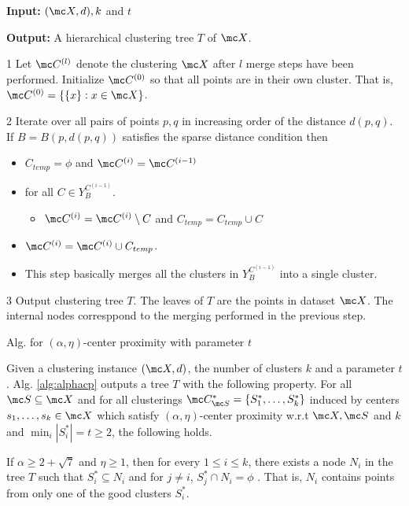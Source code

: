 \documentclass[11pt]{article}
\begin{document}
\begin{algorithm}[!ht]
\begin{alg}
	\item \textbf{Input: } $(\mc X, d), k$ and $t$
	\item \textbf{Output: } A hierarchical clustering tree $T$ of $\mc X$.
	\item[1] Let $\mc C^{(l)}$ denote the clustering $\mc X$ after $l$ merge steps have been performed. Initialize $\mc C^{(0)}$ so that all points are in their own cluster. That is, $\mc C^{(0)} = \{ \{x\}: x \in \mc X\}$.
	\item[2] Iterate over all pairs of points $p, q$ in increasing order of the distance $d(p, q)$. If $B = B(p, d(p, q))$ satisfies the sparse distance condition then
	\begin{itemize}
	\renewcommand\labelitemi{}
		\item $C_{temp} = \phi$ and $\mc C^{(i)} = \mc C^{(i-1)}$
		\item for all $C \in Y_B^{C^{(i-1)}}$.
		\begin{itemize}
		\renewcommand\labelitemii{}
			\item $\mc C^{(i)} = \mc C^{(i)} \setminus C$ and $C_{temp} = C_{temp} \cup C$
		\end{itemize}
		\item $\mc C^{(i)} = \mc C^{(i)} \cup C_{temp}$.
		\item This step basically merges all the clusters in $Y_B^{C^{(i-1)}}$ into a single cluster.
	\end{itemize}
	\item[3] Output clustering tree $T$. The leaves of $T$ are the points in dataset $\mc X$. The internal nodes corresppond to the merging performed in the previous step.
\end{alg}
\caption{Alg. for $(\alpha, \eta)$-center proximity with parameter $t$}
\label{alg:alphacp}
\end{algorithm}


\begin{theorem}
\label{thm:alphacpnoise}
Given a clustering instance $(\mc X, d)$, the number of clusters $k$ and a parameter $t$. Alg. \ref{alg:alphacp} outputs a tree $T$ with the following property. For all $\mc S \subseteq \mc X$ and for all clusterings $\mc C^*_{\mc S} = \{S_1^*, \ldots, S_k^*\}$ induced by centers $s_1, \ldots, s_k \in \mc X$ which satisfy $(\alpha, \eta)$-center proximity w.r.t $\mc X, \mc S$ and $k$ and $ \min_i|S_i^*| = t \ge 2$, the following holds. 

If $\alpha \ge 2 + \sqrt 7$ and $\eta \ge 1$, then for every $1\le i \le k$, there exists a node $N_i$ in the tree $T$ such that $S_i^* \subseteq N_i$ and for $j \neq i$, $S_j^* \cap N_i = \phi$ . That is, $N_i$ contains points from only one of the good clusters $S_i^*$.
\end{theorem}
\end{document}
